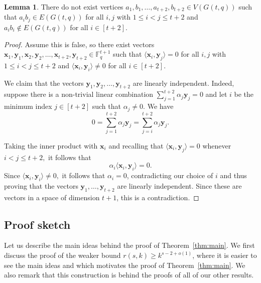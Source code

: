 \documentclass{article}
\theoremstyle{plain}
\newtheorem{lemma}[theorem]{Lemma}
\theoremstyle{definition}
\newtheorem{lemma}{Lemma}
\newcommand{\bF}{\mathbb{F}}
\newcommand{\bx}{\mathbf{x}}
\newcommand{\by}{\mathbf{y}}
\begin{document}
\begin{lemma} \label{lem:Hs-free}
    There do not exist vertices $a_1, b_1, \dots, a_{t+2}, b_{t+2} \in V(G(t, q))$ such that $a_ib_j \in E(G(t, q))$ for all $i, j$ with $1 \le i < j \le t+2$ and $a_i b_i \not\in E(G(t, q))$ for all $i \in [t+2]$.
\end{lemma}
\begin{proof}
    Assume this is false, so there exist vectors $\bx_1, \by_1, \bx_2, \by_2, \dots, \bx_{t+2}, \by_{t+2} \in \bF_q^{t+1}$ such that $\langle \bx_i, \by_j \rangle = 0$ for all $i, j$ with $1 \le i < j \le t+2$ and $\langle \bx_i, \by_i \rangle \neq 0$ for all $i \in [t+2]$.
    
    We claim that the vectors $\by_1, \by_2, \dots, \by_{t+2}$ are linearly independent. Indeed, suppose there is a non-trivial linear combination $\sum_{j=1}^{t+2} \alpha_j \by_j = 0$ and let $i$ be the minimum index $j \in [t+2]$ such that $\alpha_j \neq 0$. We have
    \[ 0 = \sum_{j=1}^{t+2} \alpha_j \by_j = \sum_{j=i}^{t+2} \alpha_j \by_j. \]

    Taking the inner product with $\bx_i$ and recalling that $\langle \bx_i, \by_j \rangle = 0$ whenever $i < j \le t+2,$ it follows that
    \[ \alpha_i \langle \bx_i, \by_i \rangle = 0. \]
    Since $\langle \bx_i, \by_i \rangle \neq 0,$ it follows that $\alpha_i = 0$, contradicting our choice of $i$ and thus proving that the vectors $\by_1, \dots, \by_{t+2}$ are linearly independent. Since these are vectors in a space of dimension $t+1$, this is a contradiction.
\end{proof}

\subsection{Proof sketch} \label{subsec:sketch}
    Let us describe the main ideas behind the proof of Theorem~\ref{thm:main}. We first discuss the proof of the weaker bound $r(s, k) \ge k^{s-2+o(1)}$, where it is easier to see the main ideas and which motivates the proof of Theorem~\ref{thm:main}. We also remark that this construction is behind the proofs of all of our other results.
    
\end{document}
